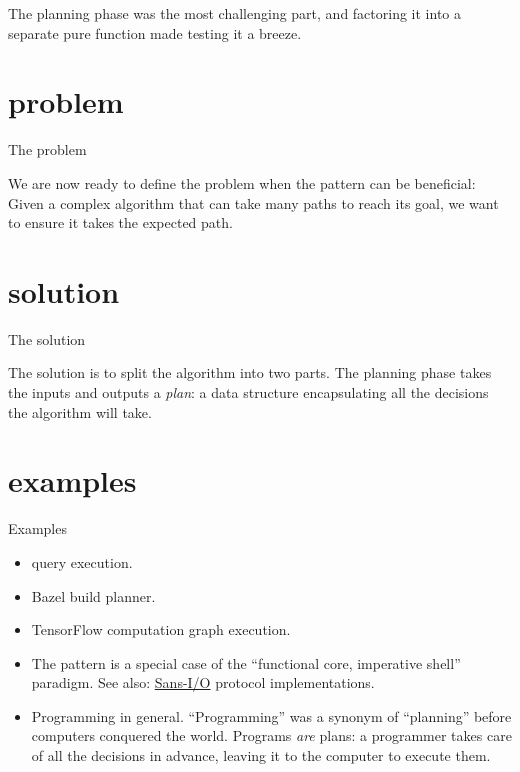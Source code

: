 \documentclass{article}
\begin{document}
The planning phase was the most challenging part, and factoring it into a separate pure function made testing it a breeze.

\section{problem}{The problem}

We are now ready to define the problem when the pattern can be beneficial:
Given a complex algorithm that can take many paths to reach its goal, we want to ensure it takes the expected path.

\section{solution}{The solution}

The solution is to split the algorithm into two parts.
The planning phase takes the inputs and outputs a \emph{plan}: a data structure encapsulating all the decisions the algorithm will take.

\section{examples}{Examples}

\begin{itemize}
    \item {} query execution.
    \item Bazel build planner.
    \item TensorFlow computation graph execution.
    \item The pattern is a special case of the ``functional core, imperative shell'' paradigm.
    See also: \href{https://sans-io.readthedocs.io/how-to-sans-io.html}{Sans-I/O} protocol implementations.
    \item Programming in general.
    ``Programming'' was a synonym of ``planning'' before computers conquered the world.
    Programs \emph{are} plans: a programmer takes care of all the decisions in advance, leaving it to the computer to execute them.
\end{itemize}
\end{document}

